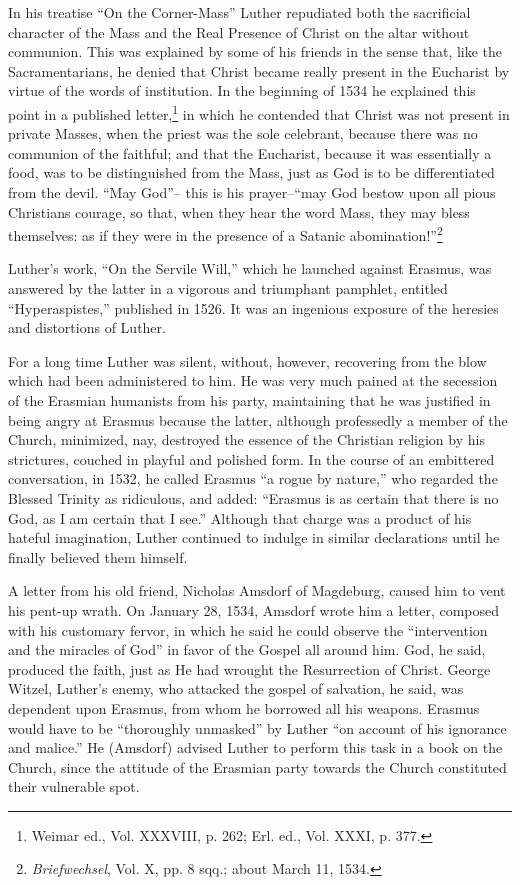 In his treatise “On the Corner-Mass” Luther repudiated both the
sacrificial character of the Mass and the Real Presence of Christ on
the altar without communion. This was explained by some of his
friends in the sense that, like the Sacramentarians, he denied that
Christ became really present in the Eucharist by virtue of the words
of institution. In the beginning of 1534 he explained this point
in a published letter,\footnote{Weimar ed., Vol. XXXVIII, p. 262; Erl. ed., Vol. XXXI, p. 377.}
 in which he contended that Christ was not
present in private Masses, when the priest was the sole celebrant, because
there was no communion of the faithful; and that the Eucharist,
because it was essentially a food, was to be distinguished from the
Mass, just as God is to be differentiated from the devil. “May God”--
this is his prayer--“may God bestow upon all pious Christians courage,
so that, when they hear the word Mass, they may bless themselves:
as if they were in the presence of a Satanic abomination!”\footnote{\textit{Briefwechsel}, Vol. X, pp. 8 sqq.; about March 11, 1534.}

Luther’s work, “On the Servile Will,” which he launched against
Erasmus, was answered by the latter in a vigorous and triumphant
pamphlet, entitled “Hyperaspistes,” published in 1526. It was an ingenious
exposure of the heresies and distortions of Luther.

For a long time Luther was silent, without, however, recovering from
the blow which had been administered to him. He was very much pained at
the secession of the Erasmian humanists from his party, maintaining that he
was justified in being angry at Erasmus because the latter, although professedly
a member of the Church, minimized, nay, destroyed the essence of
the Christian religion by his strictures, couched in playful and polished form.
In the course of an embittered conversation, in 1532, he called Erasmus “a
rogue by nature,” who regarded the Blessed Trinity as ridiculous, and added:
“Erasmus is as certain that there is no God, as I am certain that I see.”
Although that charge was a product of his hateful imagination, Luther
continued to indulge in similar declarations until he finally believed
them himself.

A letter from his old friend, Nicholas Amsdorf of Magdeburg, caused him
to vent his pent-up wrath. On January 28, 1534, Amsdorf wrote him a
letter, composed with his customary fervor, in which he said he could
observe the “intervention and the miracles of God” in favor of the Gospel
all around him. God, he said, produced the faith, just as He had wrought
the Resurrection of Christ. George Witzel, Luther’s enemy, who attacked
the gospel of salvation, he said, was dependent upon Erasmus, from whom
he borrowed all his weapons. Erasmus would have to be “thoroughly unmasked”
by Luther “on account of his ignorance and malice.” He (Amsdorf)
advised Luther to perform this task in a book on the Church, since
the attitude of the Erasmian party towards the Church constituted their
vulnerable spot.

